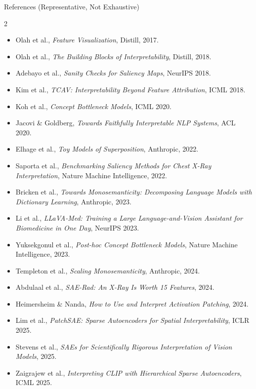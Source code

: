 \documentclass[aspectratio=169,11pt]{beamer}
\begin{document}
\begin{frame}{References (Representative, Not Exhaustive)}
    \scriptsize
    \begin{multicols}{2}
    \begin{itemize}
        \item Olah et al., \textit{Feature Visualization}, Distill, 2017.
        \item Olah et al., \textit{The Building Blocks of Interpretability}, Distill, 2018.
        \item Adebayo et al., \textit{Sanity Checks for Saliency Maps}, NeurIPS 2018.
        \item Kim et al., \textit{TCAV: Interpretability Beyond Feature Attribution}, ICML 2018.
        \item Koh et al., \textit{Concept Bottleneck Models}, ICML 2020.
        \item Jacovi \& Goldberg, \textit{Towards Faithfully Interpretable NLP Systems}, ACL 2020.
        \item Elhage et al., \textit{Toy Models of Superposition}, Anthropic, 2022.
        \item Saporta et al., \textit{Benchmarking Saliency Methods for Chest X-Ray Interpretation}, Nature Machine Intelligence, 2022.
        \item Bricken et al., \textit{Towards Monosemanticity: Decomposing Language Models with Dictionary Learning}, Anthropic, 2023.
        \item Li et al., \textit{LLaVA-Med: Training a Large Language-and-Vision Assistant for Biomedicine in One Day}, NeurIPS 2023.
        \item Yuksekgonul et al., \textit{Post-hoc Concept Bottleneck Models}, Nature Machine Intelligence, 2023.
        \item Templeton et al., \textit{Scaling Monosemanticity}, Anthropic, 2024.
        \item Abdulaal et al., \textit{SAE-Rad: An X-Ray Is Worth 15 Features}, 2024.
        \item Heimersheim \& Nanda, \textit{How to Use and Interpret Activation Patching}, 2024.
        \item Lim et al., \textit{PatchSAE: Sparse Autoencoders for Spatial Interpretability}, ICLR 2025.
        \item Stevens et al., \textit{SAEs for Scientifically Rigorous Interpretation of Vision Models}, 2025.
        \item Zaigrajew et al., \textit{Interpreting CLIP with Hierarchical Sparse Autoencoders}, ICML 2025.

\end{itemize}
\end{multicols}
\end{frame}
\end{document}
